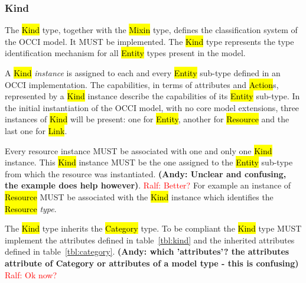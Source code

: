 \documentclass[10pt,a4paper]{article}
\newcommand{\ralf}[1]{\textcolor{red}{Ralf: #1}}
\begin{document}
\subsubsection{Kind}
\label{sec:kind}

The \hl{Kind} type, together with the \hl{Mixin} type, defines the
classification system of the OCCI model. It MUST be implemented. The \hl{Kind}
type represents the type identification mechanism for all \hl{Entity} types present in
the model.

A \hl{Kind} {\em instance} is assigned to each and every \hl{Entity} sub-type
defined in an OCCI implementation. The capabilities, in terms of attributes and
\hl{Action}s, represented by a \hl{Kind} instance describe the capabilities of
its \hl{Entity} sub-type.
%
In the initial instantiation of the OCCI model, with no core model extensions, three instances
of \hl{Kind} will be present: one for \hl{Entity}, another for \hl{Resource}
and the last one for \hl{Link}. 

Every resource instance MUST be associated with one and only one \hl{Kind}
instance. This \hl{Kind} instance MUST be the one assigned to the \hl{Entity}
sub-type from which the resource was instantiated.
\textbf{(Andy: Unclear and confusing, the example does help however)}. 
\ralf{Better?}
For example an instance of \hl{Resource} MUST be
associated with the \hl{Kind} instance which identifies the \hl{Resource} {\em
type}.

The \hl{Kind} type inherits the \hl{Category} type. To be compliant the \hl{Kind}
type MUST implement the attributes defined in table~\ref{tbl:kind} and the inherited
attributes defined in table~\ref{tbl:category}.
\textbf{(Andy: which 'attributes'? the attributes attribute of Category 
or attributes of a model type - this is confusing)}
\ralf{Ok now?}
\end{document}

